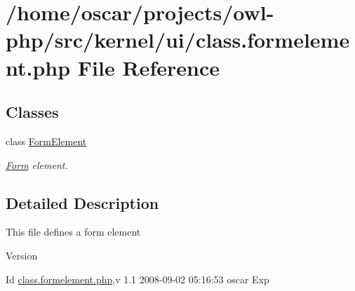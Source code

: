 \section{/home/oscar/projects/owl-\/php/src/kernel/ui/class.formelement.php File Reference}
\label{class_8formelement_8php}
\subsection*{Classes}
\begin{DoxyCompactItemize}
\item 
class \hyperlink{classFormElement}{FormElement}
\begin{DoxyCompactList}\small\item\em \hyperlink{classForm}{Form} element. \item\end{DoxyCompactList}\end{DoxyCompactItemize}


\subsection{Detailed Description}
This file defines a form element \begin{DoxyVersion}{Version}

\end{DoxyVersion}
\begin{DoxyParagraph}{Id}
\hyperlink{class_8formelement_8php}{class.formelement.php},v 1.1 2008-\/09-\/02 05:16:53 oscar Exp 
\end{DoxyParagraph}
